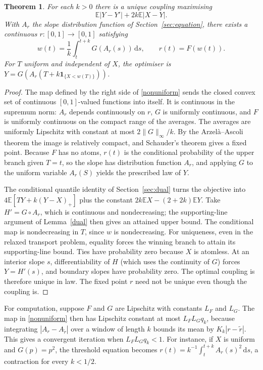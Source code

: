\documentclass[11pt,a4paper]{article}
\newtheorem{theorem}{Theorem}
\theoremstyle{remark}
\newcommand{\E}{\mathbb E}
\newcommand{\1}{\mathbf 1}
\newcommand{\dd}{\,\mathrm d}
\begin{document}
\begin{theorem}\label{general}
For each $k>0$ there is a unique coupling maximising
\[
 \E|Y-Y'|+2k\E|X-Y|.
\]
With $A_r$ the slope distribution function of Section~\ref{sec:equation}, there exists a continuous $r:[0,1]\to[0,1]$ satisfying
\begin{equation}
 w(t)=\frac1k\int_t^{t+k}G(A_r(s))\dd s,\qquad r(t)=F(w(t)).\label{nonuniform}
\end{equation}
For $T$ uniform and independent of $X$, the optimiser is
$Y=G(A_r(T+k\1_{\{X<w(T)\}}))$.
\end{theorem}
\begin{proof}
The map defined by the right side of \eqref{nonuniform} sends the closed convex set of continuous $[0,1]$-valued functions into itself. It is continuous in the supremum norm: $A_r$ depends continuously on $r$, $G$ is uniformly continuous, and $F$ is uniformly continuous on the compact range of the averages. The averages are uniformly Lipschitz with constant at most $2\|G\|_\infty/k$. By the Arzel\`a--Ascoli theorem the image is relatively compact, and Schauder's theorem gives a fixed point. Because $F$ has no atoms, $r(t)$ is the conditional probability of the upper branch given $T=t$, so the slope has distribution function $A_r$, and applying $G$ to the uniform variable $A_r(S)$ yields the prescribed law of $Y$.

The conditional quantile identity of Section~\ref{sec:dual} turns the objective into $4\E[TY+k(Y-X)_+]$ plus the constant $2k\E X-(2+2k)\E Y$. Take $H'=G\circ A_r$, which is continuous and nondecreasing; the supporting-line argument of Lemma~\ref{dual} then gives an attained upper bound. The conditional map is nondecreasing in $T$, since $w$ is nondecreasing. For uniqueness, even in the relaxed transport problem, equality forces the winning branch to attain its supporting-line bound. Ties have probability zero because $X$ is atomless. At an interior slope $s$, differentiability of $H$ (which uses the continuity of $G$) forces $Y=H'(s)$, and boundary slopes have probability zero. The optimal coupling is therefore unique in law. The fixed point $r$ need not be unique even though the coupling is.
\end{proof}

For computation, suppose $F$ and $G$ are Lipschitz with constants $L_F$ and $L_G$. The map in \eqref{nonuniform} then has Lipschitz constant at most $L_FL_Gq_k$, because integrating $|A_r-A_{\widetilde r}|$ over a window of length $k$ bounds its mean by $K_k|r-\widetilde r|$. This gives a convergent iteration when $L_FL_Gq_k<1$. For instance, if $X$ is uniform and $G(p)=p^2$, the threshold equation becomes $r(t)=k^{-1}\int_t^{t+k} A_r(s)^2\dd s$, a contraction for every $k<1/2$.
\end{document}
